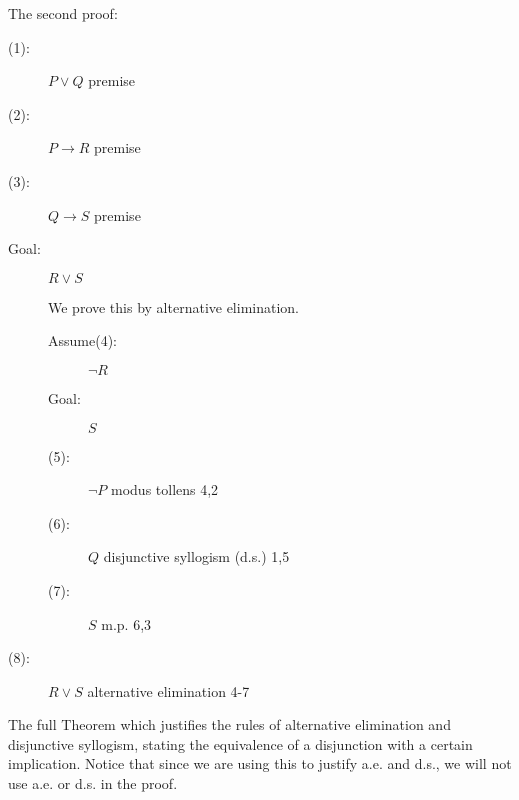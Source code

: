\documentclass[12pt]{article}
\begin{document}
\newpage

The second proof:

\begin{description}

\item[(1):]  $P \vee Q$  premise

\item[(2):]  $P \rightarrow R$ premise

\item[(3):]  $Q \rightarrow S$  premise

\item[Goal:]  $R \vee S$

We  prove this by alternative elimination.

\begin{description}

\item[Assume(4):] $\neg R$

\item[Goal:]  $S$

\item[(5):]  $\neg P$ modus tollens 4,2

\item[(6):]  $Q$ disjunctive syllogism (d.s.) 1,5

\item[(7):]  $S$ m.p. 6,3

\end{description}

\item[(8):]  $R \vee S$ alternative elimination 4-7

\end{description}

\newpage

The full Theorem which justifies the rules of alternative elimination and disjunctive syllogism, stating the equivalence of a disjunction with a certain implication.  Notice that since we are using this to justify a.e. and d.s., we will not use a.e. or d.s. in the proof.
\end{document}
